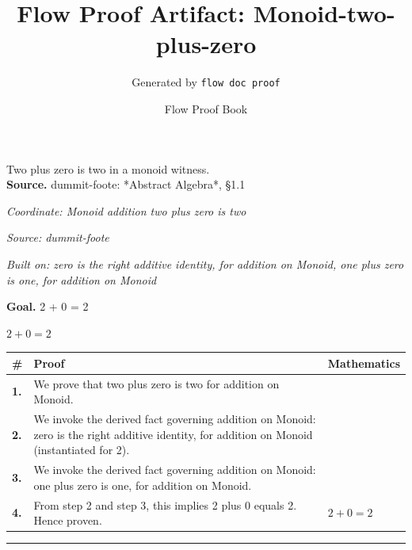 \documentclass[11pt]{article}
\title{Flow Proof Artifact: Monoid-two-plus-zero}
\author{Generated by \texttt{flow doc proof}}
\date{Flow Proof Book}
\theoremstyle{definition}
\begin{document}
\maketitle
Two plus zero is two in a monoid witness.\\[0.5em]
\textbf{Source.} dummit-foote: *Abstract Algebra*, §1.1\\[0.5em]
\bigskip
{}\par
\smallskip\noindent\textit{Coordinate: Monoid \cdot addition \cdot two plus zero is two}\par
\smallskip\noindent\textit{Source: dummit-foote}\par
\smallskip\noindent\textit{Built on: zero is the right additive identity, for addition on Monoid, one plus zero is one, for addition on Monoid}\par
\medskip
\noindent\textbf{Goal.} 2 + 0 = 2\par
\noindent$\displaystyle 2 + 0 = 2$\par
\medskip
\noindent
\begin{tabular}{@{} >{\raggedright\arraybackslash}p{} >{\raggedright\arraybackslash}p{} >{\raggedleft\arraybackslash}p{} @{}}
\textbf{\#} & \textbf{Proof} & \textbf{Mathematics} \\
\midrule
\textbf{1.} & We prove that two plus zero is two for addition on Monoid. & \\[0.45em]
\textbf{2.} & We invoke the derived fact governing addition on Monoid: zero is the right additive identity, for addition on Monoid (instantiated for 2). & \\[0.45em]
\textbf{3.} & We invoke the derived fact governing addition on Monoid: one plus zero is one, for addition on Monoid. & \\[0.45em]
\textbf{4.} & From step 2 and step 3, this implies 2 plus 0 equals 2. Hence proven. & $\displaystyle 2 + 0 = 2$ \\[0.45em]
\bottomrule
\end{tabular}
\label{thm:Monoid-addition-two_plus_zero_is_two}
\par\medskip\hrule
\end{document}
